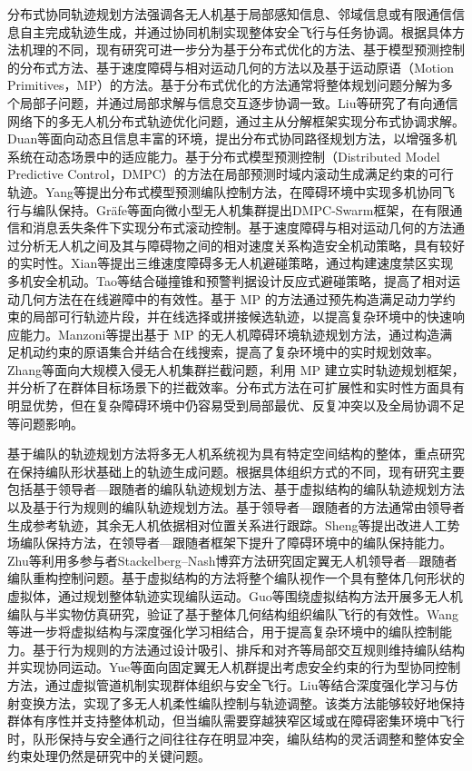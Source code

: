分布式协同轨迹规划方法强调各无人机基于局部感知信息、邻域信息或有限通信信息自主完成轨迹生成，并通过协同机制实现整体安全飞行与任务协调。根据具体方法机理的不同，现有研究可进一步分为基于分布式优化的方法、基于模型预测控制的分布式方法、基于速度障碍与相对运动几何的方法以及基于运动原语（Motion Primitives，MP）的方法。基于分布式优化的方法通常将整体规划问题分解为多个局部子问题，并通过局部求解与信息交互逐步协调一致。Liu等研究了有向通信网络下的多无人机分布式轨迹优化问题，通过主从分解框架实现分布式协调求解\cite{liu2021distributed}。Duan等面向动态且信息丰富的环境，提出分布式协同路径规划方法，以增强多机系统在动态场景中的适应能力\cite{duan2025distributed}。基于分布式模型预测控制（Distributed Model Predictive Control，DMPC）的方法在局部预测时域内滚动生成满足约束的可行轨迹。Yang等提出分布式模型预测编队控制方法，在障碍环境中实现多机协同飞行与编队保持\cite{yang2025dmpc}。Gräfe等面向微小型无人机集群提出DMPC-Swarm框架，在有限通信和消息丢失条件下实现分布式滚动控制\cite{grafe2025dmpc}。基于速度障碍与相对运动几何的方法通过分析无人机之间及其与障碍物之间的相对速度关系构造安全机动策略，具有较好的实时性。Xian等提出三维速度障碍多无人机避碰策略，通过构建速度禁区实现多机安全机动\cite{xian2025vo}。Tao等结合碰撞锥和预警判据设计反应式避碰策略，提高了相对运动几何方法在在线避障中的有效性\cite{tao2023rcatrs}。基于 MP 的方法通过预先构造满足动力学约束的局部可行轨迹片段，并在线选择或拼接候选轨迹，以提高复杂环境中的快速响应能力。Manzoni等提出基于 MP 的无人机障碍环境轨迹规划方法，通过构造满足机动约束的原语集合并结合在线搜索，提高了复杂环境中的实时规划效率\cite{manzoni2024mprims}。Zhang等面向大规模入侵无人机集群拦截问题，利用 MP 建立实时轨迹规划框架，并分析了在群体目标场景下的拦截效率\cite{zhang2024swarmprimitive}。分布式方法在可扩展性和实时性方面具有明显优势，但在复杂障碍环境中仍容易受到局部最优、反复冲突以及全局协调不足等问题影响。

基于编队的轨迹规划方法将多无人机系统视为具有特定空间结构的整体，重点研究在保持编队形状基础上的轨迹生成问题。根据具体组织方式的不同，现有研究主要包括基于领导者—跟随者的编队轨迹规划方法、基于虚拟结构的编队轨迹规划方法以及基于行为规则的编队轨迹规划方法。基于领导者—跟随者的方法通常由领导者生成参考轨迹，其余无人机依据相对位置关系进行跟踪。Sheng等提出改进人工势场编队保持方法，在领导者—跟随者框架下提升了障碍环境中的编队保持能力\cite{sheng2023leader}。Zhu等利用多参与者Stackelberg--Nash博弈方法研究固定翼无人机领导者—跟随者编队重构控制问题\cite{zhu2025leader}。基于虚拟结构的方法将整个编队视作一个具有整体几何形状的虚拟体，通过规划整体轨迹实现编队运动。Guo等围绕虚拟结构方法开展多无人机编队与半实物仿真研究，验证了基于整体几何结构组织编队飞行的有效性\cite{guo2023virtual}。Wang等进一步将虚拟结构与深度强化学习相结合，用于提高复杂环境中的编队控制能力\cite{wang2025virtual}。基于行为规则的方法通过设计吸引、排斥和对齐等局部交互规则维持编队结构并实现协同运动。Yue等面向固定翼无人机群提出考虑安全约束的行为型协同控制方法，通过虚拟管道机制实现群体组织与安全飞行\cite{yue2025behavior}。Liu等结合深度强化学习与仿射变换方法，实现了多无人机柔性编队控制与轨迹调整\cite{liu2025flexible}。该类方法能够较好地保持群体有序性并支持整体机动，但当编队需要穿越狭窄区域或在障碍密集环境中飞行时，队形保持与安全通行之间往往存在明显冲突，编队结构的灵活调整和整体安全约束处理仍然是研究中的关键问题。

